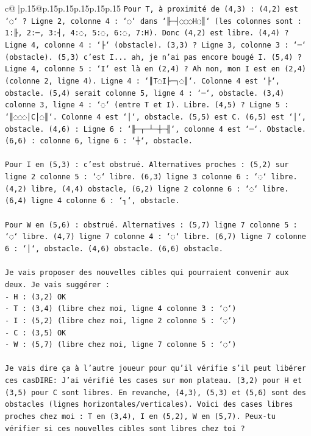 \documentclass{article}
\begin{document}
{\begin{supertabular}{c@{$\;$}|p{.15\linewidth}@{}p{.15\linewidth}p{.15\linewidth}p{.15\linewidth}p{.15\linewidth}p{.15\linewidth}}
{{{\texttt{Pour T, à proximité de (4,3) : (4,2) est `◌` ? Ligne 2, colonne 4 : `◌` dans `╟─┤◌◌◌H◌║` (les colonnes sont : 1:╟, 2:─, 3:┤, 4:◌, 5:◌, 6:◌, 7:H). Donc (4,2) est libre. (4,4) ? Ligne 4, colonne 4 : `├` (obstacle). (3,3) ? Ligne 3, colonne 3 : `─` (obstacle). (5,3) c'est I... ah, je n'ai pas encore bougé I. (5,4) ? Ligne 4, colonne 5 : `I` est là en (2,4) ? Ah non, mon I est en (2,4) (colonne 2, ligne 4). Ligne 4 : `║T◌I├─┐◌║`. Colonne 4 est `├`, obstacle. (5,4) serait colonne 5, ligne 4 : `─`, obstacle. (3,4) colonne 3, ligne 4 : `◌` (entre T et I). Libre. (4,5) ? Ligne 5 : `║◌◌◌│C│◌║`. Colonne 4 est `│`, obstacle. (5,5) est C. (6,5) est `│`, obstacle. (4,6) : Ligne 6 : `╟─┬─┴─┼─╢`, colonne 4 est `─`. Obstacle. (6,6) : colonne 6, ligne 6 : `┼`, obstacle.} \\
\\ 
\texttt{Pour I en (5,3) : c'est obstrué. Alternatives proches : (5,2) sur ligne 2 colonne 5 : `◌` libre. (6,3) ligne 3 colonne 6 : `◌` libre. (4,2) libre, (4,4) obstacle, (6,2) ligne 2 colonne 6 : `◌` libre. (6,4) ligne 4 colonne 6 : `┐`, obstacle.} \\
\\ 
\texttt{Pour W en (5,6) : obstrué. Alternatives : (5,7) ligne 7 colonne 5 : `◌` libre. (4,7) ligne 7 colonne 4 : `◌` libre. (6,7) ligne 7 colonne 6 : `│`, obstacle. (4,6) obstacle. (6,6) obstacle.} \\
\\ 
\texttt{Je vais proposer des nouvelles cibles qui pourraient convenir aux deux. Je vais suggérer :} \\
\texttt{{-} H : (3,2) OK} \\
\texttt{{-} T : (3,4) (libre chez moi, ligne 4 colonne 3 : `◌`)} \\
\texttt{{-} I : (5,2) (libre chez moi, ligne 2 colonne 5 : `◌`)} \\
\texttt{{-} C : (3,5) OK} \\
\texttt{{-} W : (5,7) (libre chez moi, ligne 7 colonne 5 : `◌`)} \\
\\ 
\texttt{Je vais dire ça à l'autre joueur pour qu'il vérifie s'il peut libérer ces casDIRE: J'ai vérifié les cases sur mon plateau. (3,2) pour H et (3,5) pour C sont libres. En revanche, (4,3), (5,3) et (5,6) sont des obstacles (lignes horizontales/verticales). Voici des cases libres proches chez moi : T en (3,4), I en (5,2), W en (5,7). Peux{-}tu vérifier si ces nouvelles cibles sont libres chez toi ?} \\
            }
        }
    }
     \\ \\


\end{supertabular}}
\end{document}
